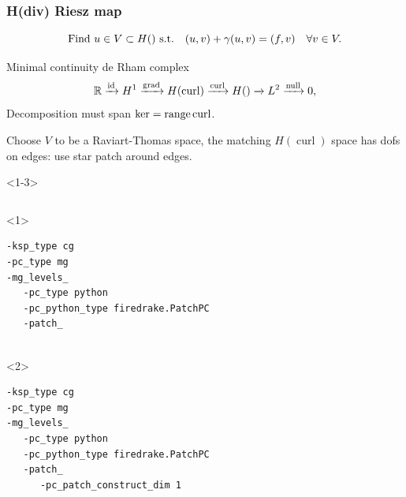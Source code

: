 \documentclass[presentation,aspectratio=43,10pt]{beamer}
\DeclareMathOperator{\grad}{grad}
\let\div\relax
\DeclareMathOperator{\div}{div}
\DeclareMathOperator{\curl}{curl}
\DeclareMathOperator{\range}{range}
\begin{document}
\begin{frame}[fragile]
  \frametitle{H(div) Riesz map}
  \vspace{-1.5\baselineskip}
  \begin{equation*}
    \text{Find $u \in V \subset H(\div)$ s.t.}\quad (u, v) + \gamma (\div u, \div v) = (f, v) \quad \forall v \in V.
  \end{equation*}
  \vspace*{-\baselineskip}
  \begin{block}{Minimal continuity de Rham complex}
    \begin{equation*}
      \mathbb{R} \xrightarrow{\operatorname{id}} H^1 \xrightarrow{\grad} H(\curl)
      \xrightarrow{\curl} H(\div) \xrightarrow{\div} L^2 \xrightarrow{\operatorname{null}} 0,
    \end{equation*}
    Decomposition must span $\ker \div = \range \curl$.

    Choose $V$ to be a Raviart-Thomas space, the matching $H(\curl)$
    space has dofs on edges: use star patch around edges.
  \end{block}
  \begin{onlyenv}<1-3>
    \begin{columns}
      \begin{column}{0.6\textwidth}
        \begin{onlyenv}<1>
\begin{verbatim}
-ksp_type cg
-pc_type mg
-mg_levels_
   -pc_type python
   -pc_python_type firedrake.PatchPC
   -patch_


\end{verbatim}
        \end{onlyenv}
        \begin{onlyenv}<2>
\begin{verbatim}
-ksp_type cg
-pc_type mg
-mg_levels_
   -pc_type python
   -pc_python_type firedrake.PatchPC
   -patch_
      -pc_patch_construct_dim 1


\end{verbatim}
\end{onlyenv}
\end{column}
\end{columns}
\end{onlyenv}
\end{frame}
\end{document}
